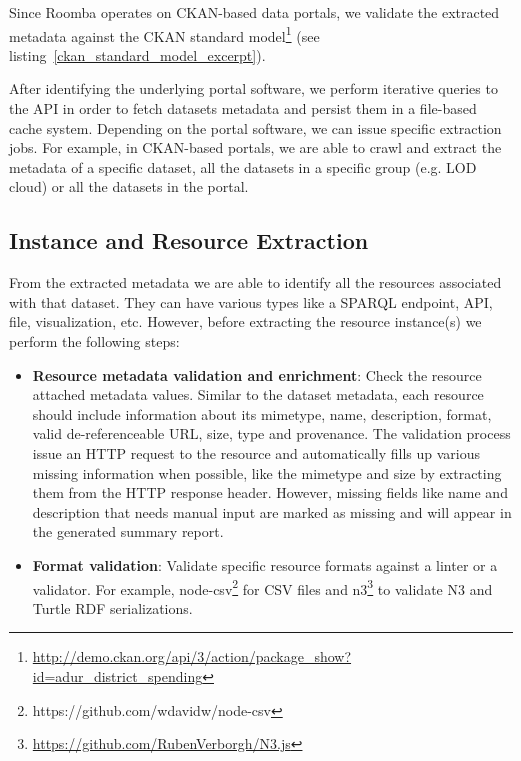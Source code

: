 Since Roomba operates on CKAN-based data portals, we validate the extracted metadata against the CKAN standard model\footnote{\url{http://demo.ckan.org/api/3/action/package\_show?id=adur\_district\_spending}} (see listing~\ref{ckan_standard_model_excerpt}).



After identifying the underlying portal software, we perform iterative queries to the API in order to fetch datasets metadata and persist them in a file-based cache system. Depending on the portal software, we can issue specific extraction jobs. For example, in CKAN-based portals, we are able to crawl and extract the metadata of a specific dataset, all the datasets in a specific group (e.g. LOD cloud) or all the datasets in the portal.

\subsection{Instance and Resource Extraction}
From the extracted metadata we are able to identify all the resources associated with that dataset. They can have various types like a SPARQL endpoint, API, file, visualization, etc. However, before extracting the resource instance(s) we perform the following steps:
\begin{itemize}
  \item \textbf{Resource metadata validation and enrichment}: Check the resource attached metadata values. Similar to the dataset metadata, each resource should include information about its mimetype, name, description, format, valid de-referenceable URL, size, type and provenance. The validation process issue an HTTP request to the resource and automatically fills up various missing information when possible, like the mimetype and size by extracting them from the HTTP response header. However, missing fields like name and description that needs manual input are marked as missing and will appear in the generated summary report.
  \item \textbf{Format validation}: Validate specific resource formats against a linter or a validator. For example, node-csv\footnote{https://github.com/wdavidw/node-csv} for CSV files and n3\footnote{\url{https://github.com/RubenVerborgh/N3.js}} to validate N3 and Turtle RDF serializations.
\end{itemize}

